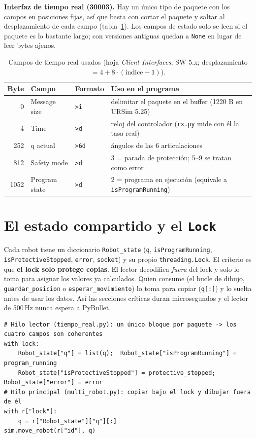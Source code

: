 \documentclass[10pt,a4paper]{article}
\newcommand{\code}[1]{\texttt{\small #1}}
\begin{document}
\textbf{Interfaz de tiempo real (30003).} Hay un único tipo de paquete con los campos en posiciones fijas, así que basta con cortar el paquete y saltar al desplazamiento de cada campo (tabla~\ref{tab:rt}). Los campos de estado solo se leen si el paquete es lo bastante largo; con versiones antiguas quedan a \code{None} en lugar de leer bytes ajenos.

\begin{table}[h]
\centering\small
\caption{Campos de tiempo real usados (hoja \emph{Client Interfaces}, SW 5.x; desplazamiento $=4+8\cdot(\text{índice}-1)$).}\label{tab:rt}
\begin{tabular}{@{}r l l l@{}}
\toprule
Byte & Campo & Formato & Uso en el programa \\ \midrule
0 & Message size & \code{>i} & delimitar el paquete en el buffer (1220 B en URSim 5.25)\\
4 & Time & \code{>d} & reloj del controlador (\code{rx.py} mide con él la tasa real)\\
252 & q actual & \code{>6d} & ángulos de las 6 articulaciones\\
812 & Safety mode & \code{>d} & 3 = parada de protección; 5--9 se tratan como error\\
1052 & Program state & \code{>d} & 2 = programa en ejecución (equivale a \code{isProgramRunning})\\ \bottomrule
\end{tabular}
\end{table}

\section{El estado compartido y el \texttt{Lock}}

Cada robot tiene un diccionario \code{Robot\_state} (\code{q}, \code{isProgramRunning}, \code{isProtectiveStopped}, \code{error}, \code{socket}) y su propio \code{threading.Lock}. El criterio es que \textbf{el lock solo protege copias}. El lector decodifica \emph{fuera} del lock y solo lo toma para asignar los valores ya calculados. Quien consume (el bucle de dibujo, \code{guardar\_posicion} o \code{esperar\_movimiento}) lo toma para copiar (\code{q[:]}) y lo suelta antes de usar los datos. Así las secciones críticas duran microsegundos y el lector de 500\,Hz nunca espera a PyBullet.

\begin{lstlisting}[numbers=none]
# Hilo lector (tiempo_real.py): un único bloque por paquete -> los cuatro campos son coherentes
with lock:
    Robot_state["q"] = list(q);  Robot_state["isProgramRunning"] = program_running
    Robot_state["isProtectiveStopped"] = protective_stopped;  Robot_state["error"] = error
# Hilo principal (multi_robot.py): copiar bajo el lock y dibujar fuera de él
with r["lock"]:
    q = r["Robot_state"]["q"][:]
sim.move_robot(r["id"], q)
\end{lstlisting}
\end{document}
